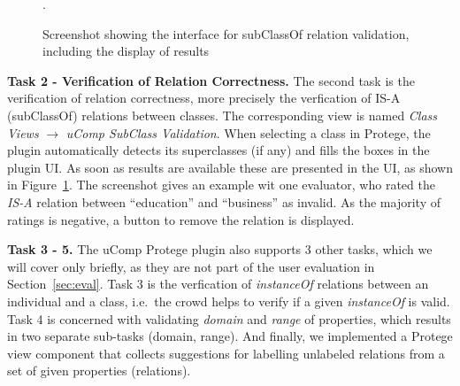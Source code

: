 \begin{figure}[htb]
\centering
{\centering {}}
 \caption{\label{fig:screen_sub}Screenshot showing the interface for subClassOf relation validation, including the display of results}.
\end{figure}


\textbf{Task 2 - Verification of Relation Correctness.}
The second task is the verification of relation correctness, more precisely the verfication of IS-A (subClassOf) relations between classes.
The corresponding view is named \emph{Class Views} $\rightarrow{}$ \emph{uComp SubClass Validation}. When selecting a class in Protege,
the plugin automatically detects its superclasses (if any) and fills the boxes in the plugin UI.
As soon as results are available these are presented in the UI, as shown in Figure~\ref{fig:screen_sub}. The screenshot gives an example
wit one evaluator, who rated the \emph{IS-A} relation between ``education'' and ``business'' as invalid. As the majority of ratings is negative,
a button to remove the relation is displayed.

\textbf{Task 3 - 5.}
The uComp Protege plugin also supports 3 other tasks, which we will cover only briefly, as they are not part of the user evaluation in
Section~\ref{sec:eval}. Task 3 is the verfication of \emph{instanceOf} relations between an individual and a class, i.e.~the crowd helps
to verify if a given \emph{instanceOf} is valid. Task 4 is concerned with validating \emph{domain} and \emph{range} of properties, which
results in two separate sub-tasks (domain, range). And finally, we implemented a Protege view component that collects suggestions for 
labelling unlabeled relations from a set of given properties (relations).
